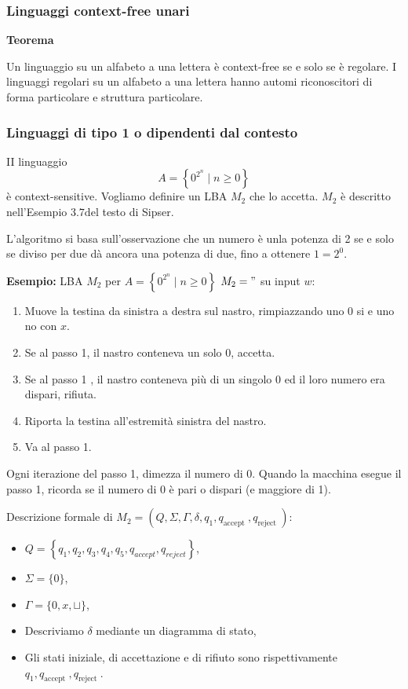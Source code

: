 \subsubsection{Linguaggi context-free unari}

\textbf{Teorema}

Un linguaggio su un alfabeto a una lettera è context-free se e solo se è regolare. I linguaggi regolari su un alfabeto a una lettera hanno automi riconoscitori di forma particolare e struttura particolare.

\subsubsection{Linguaggi di tipo 1 o dipendenti dal contesto}

II linguaggio
$$
A=\left\{0^{2^{n}} \mid n \geq 0\right\}
$$
è context-sensitive. Vogliamo definire un LBA $M_{2}$ che lo accetta.
$M_{2}$ è descritto nell'Esempio $3.7 \mathrm{del}$ testo di Sipser.

L'algoritmo si basa sull'osservazione che un numero è unla potenza di 2 se e solo se diviso per due dà ancora una potenza di due, fino a ottenere $1=2^{0}$.

\vspace{5mm}

\textbf{Esempio:} LBA $M_{2}$ per $A=\left\{0^{2^{n}} \mid n \geq 0\right\}$
$M_{2}="$ su input $w:$
\begin{enumerate}
    \item  Muove la testina da sinistra a destra sul nastro, rimpiazzando uno 0 si e uno no con $x$.
    \item Se al passo 1, il nastro conteneva un solo 0, accetta.
    \item Se al passo 1 , il nastro conteneva più di un singolo 0 ed il loro numero era dispari, rifiuta.
    \item  Riporta la testina all'estremità sinistra del nastro.
    \item Va al passo 1.
\end{enumerate}

Ogni iterazione del passo 1, dimezza il numero di $0 .$
Quando la macchina esegue il passo 1, ricorda se il numero di 0 è pari o dispari (e maggiore di 1).

\vspace{5mm}

Descrizione formale di $M_{2}=\left(Q, \Sigma, \Gamma, \delta, q_{1}, q_{\text {accept }}, q_{\text {reject }}\right):$
\begin{itemize}
    \item $Q=\left\{q_{1}, q_{2}, q_{3}, q_{4}, q_{5}, q_{a c c e p t}, q_{r e j e c t}\right\}$,
    \item $\Sigma=\{0\}$,
    \item $\Gamma=\{0, x, \sqcup\}$,
    \item Descriviamo $\delta$ mediante un diagramma di stato,
    \item Gli stati iniziale, di accettazione e di rifiuto sono rispettivamente $q_{1}, q_{\text {accept }}, q_{\text {reject }}$.
\end{itemize}


